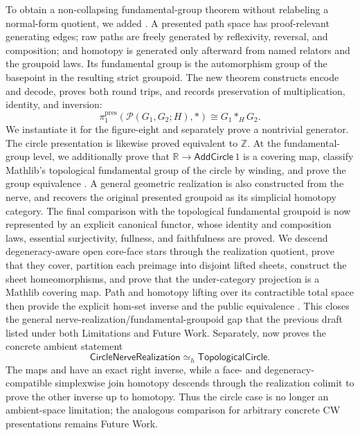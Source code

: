 \documentclass[11pt]{article}
\begin{document}
To obtain a non-collapsing fundamental-group theorem without relabeling a
normal-form quotient, we added .  A
presented path space has proof-relevant generating edges; raw paths are freely
generated by reflexivity, reversal, and composition; and homotopy is generated
only afterward from named relators and the groupoid laws.  Its fundamental
group is the automorphism group of the basepoint in the resulting strict
groupoid.  The new theorem 
constructs encode and decode, proves both round trips, and records preservation
of multiplication, identity, and inversion:
\[
\pi_1^{\mathrm{pres}}(\mathcal P(G_1,G_2;H),*)
\cong G_1*_H G_2.
\]
We instantiate it for the figure-eight and separately prove a nontrivial
generator.  The circle presentation is likewise proved equivalent to
\(\mathbb Z\).  At the fundamental-group level, we additionally prove that
\(\mathbb R\to\mathsf{AddCircle}\,1\) is a covering map, classify Mathlib's
topological fundamental group of the circle by winding, and prove the group
equivalence .  A general
geometric realization is also constructed from the nerve, and
 recovers the original presented
groupoid as its simplicial homotopy category.  The final comparison with the
topological fundamental groupoid is now represented by an explicit canonical
functor, whose identity and composition laws, essential surjectivity, fullness,
and faithfulness are proved.  We descend degeneracy-aware open core-face stars
through the realization quotient, prove that they cover, partition each
preimage into disjoint lifted sheets, construct the sheet homeomorphisms, and
prove that the under-category projection is a Mathlib covering map.  Path and
homotopy lifting over its contractible total space then provide the explicit
hom-set inverse and the public equivalence
.
This closes the general nerve-realization/fundamental-groupoid gap that the
previous draft listed under both Limitations and Future Work.  Separately,
 now proves the concrete ambient statement
\[
\mathsf{CircleNerveRealization}\simeq_h\mathsf{TopologicalCircle}.
\]
The maps  and  have an
exact right inverse, while a face- and degeneracy-compatible simplexwise join
homotopy descends through the realization colimit to prove the other inverse
up to homotopy.  Thus the circle case is no longer an ambient-space limitation;
the analogous comparison for arbitrary concrete CW presentations remains
Future Work.
\end{document}
